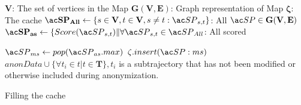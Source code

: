 \begin{algorithm}%
\dontprintsemicolon
\SetVline


\KwData
{

	\hspace{-0.6em}$\mathbf{V}$: The set of vertices in the Map \;
	\hspace{-0.6em}$\mathbf{G(V,E)}$: Graph representation of Map \;
	\hspace{-0.6em}$\mathbf{\zeta}$: The cache \;
	\hspace{-0.6em}$\mathbf{\spath_{All}} \leftarrow \{s \in \mathbf{V}, t \in \mathbf{V}, s \neq t : \spath_{s,t}\}$: All $\spath \in \mathbf{G(V,E)}$ \;
	\hspace{-0.6em}$\mathbf{\spath_{as}} \leftarrow \{Score(\spath_{s,t}) \| \forall \spath_{s,t} \in \spath_{All}$: All scored \spaths \;
}


{
	$\spath_{ms} \leftarrow pop(\spath_{as}.max)$  \; 
	{
		$\zeta.insert(\spath:{ms})$\;
	}
}
\(anonData \cup \{\forall t_i  \in t  | t \in \mathbf{T}\}, t_i \) is a subtrajectory that has not been modified or otherwise included during anonymization.

\caption{Filling the cache}
\label{alg:greedy}
\end{algorithm}